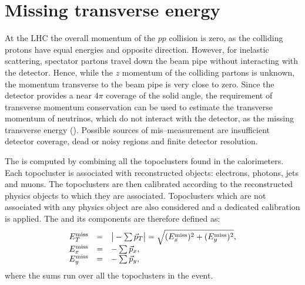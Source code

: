 \section{Missing transverse energy}
\label{sec:met}

At the LHC the overall momentum of the $pp$ collision is zero, as the
colliding protons have equal energies and opposite direction. 
However, for inelastic scattering, spectator partons travel down the
beam pipe without interacting with the detector. Hence, while the $z$
momentum of the colliding partons is unknown, the momentum transverse
to the beam pipe is very close to zero. Since the detector provides a
near $4\pi$ coverage of the solid angle, the requirement of transverse
momentum conservation can be used to estimate the transverse
momentum of neutrinos, which do not interact with the detector, as the
missing transverse energy (\met{}). Possible sources of \met{}
mis--measurement are insufficient detector coverage, dead or noisy
regions and finite detector resolution.

The \met{} is computed by combining all the topoclusters found in the
calorimeters. Each topocluster is associated with reconstructed
objects: electrons, photons, jets and muons. The topoclusters are then
calibrated according to the reconstructed physics objects to which
they are associated. Topoclusters which are not associated with any
physics object are also considered and a dedicated calibration is
applied. 
The \met{} and its components are therefore defined as:
\begin{equation}\label{eq:met}
\begin{array}{lcl}
E^{\rm miss}_{T} & = & \big|-\sum\vec{p}_T \big| = \sqrt{(E^{\rm miss}_{x})^2 + (E^{\rm miss}_{y})^2} ,\\
E^{\rm miss}_{x} & = & -\sum\vec{p}_x ,\\
E^{\rm miss}_{y} & = & -\sum\vec{p}_y ,\\
\end{array}	\end{equation}
where the sums run over all the topoclusters in the event.
